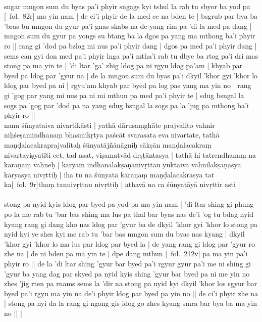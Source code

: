\documentclass[12pt]{article}
\begin{document}
\textbf{\TVB}\\
sngar mngon sum du byas pa'i phyir sngags kyi tshul la rab tu sbyor ba yod pa [\TVB\ fol.\ 82r] ma yin nam | de ci'i phyir de la med ce na bden te | bsgrub par bya ba 'bras bu mngon du gyur pa'i gnas skabs na de yang rim pa 'di la med pa dang | mngon sum du gyur pa yongs su btang ba la dgos pa yang ma mthong ba'i phyir ro || rang gi 'dod pa bzlog mi nus pa'i phyir dang | dgos pa med pa'i phyir dang | sems can gyi don med pa'i phyir lnga pa'i mtha'i rab tu dbye ba rtog pa'i dri mas stong pa ma yin te | 'di ltar 'ga' zhig ldog pa ni rgyu ldog pa'am | khyab par byed pa ldog par 'gyur na | de la mngon sum du byas pa'i dkyil 'khor gyi 'khor lo ldog par byed pa ni | rgyu'am khyab par byed pa log pas yang ma yin no | rang gi 'gog par yang mi nus pa ni mi mthun pa med pa'i phyir te | sdug bsngal la sogs pa 'gog par 'dod pa na yang sdug bsngal la sogs pa la 'jug pa mthong ba'i phyir ro || \\

nanu śūnyataiva nivartikāsti | yathā dārusaṃghāte prajvalito vahnir niḥśeṣamindhanaṃ bhasmīkṛtya paścāt svarasata eva nivartate, tathā maṇḍalacakraprajvalitaḥ śūnyatājñānāgniḥ sākṣān maṇḍalacakraṃ nivartayiṣyatīti cet, tad asat, viṣamatvād dṛṣṭāntasya | tathā hi tatrendhanaṃ na kāraṇaṃ vahneḥ | kāryam indhanalakṣaṇanivṛttau yuktaiva vahnilakṣaṇasya kāryasya nivṛttiḥ | iha tu na śūnyatā kāraṇaṃ maṇḍalacakrasya tat ka[\MS\ fol.\ 9r]thaṃ tannivṛttau nivṛttiḥ | athavā na ca śūnyatāyā nivṛttir asti |\\

\textbf{\TVA}\\
stong pa nyid kyis ldog par byed pa yod pa ma yin nam | 'di ltar shing gi phung po la me rab tu 'bar bas shing ma lus pa thal bar byas nas de'i 'og tu bdag nyid kyang rang gi dang kho nas ldog par 'gyur ba de dkyil 'khor gyi 'khor lo stong pa nyid kyi ye shes kyi me rab tu 'bar bas mngon sum du byas nas kyang | dkyil 'khor gyi 'khor lo ma lus par ldog par byed la | de yang rang gi ldog par 'gyur ro zhe na | de ni bden pa ma yin te | dpe dang mthun [\TVA\ fol.\ 212v] pa ma yin pa'i phyir ro || de la 'di ltar shing 'gyur bar byed pa'i rgyur gyur pa'i me ni shing gi 'gyur ba yang dag par skyed pa nyid kyis shing 'gyur bar byed pa ni me yin no zhes 'jig rten pa rnams sems la 'dir na stong pa nyid kyi dkyil 'khor los sgyur bar byed pa'i rgyu ma yin na de'i phyir ldog par byed pa yin no || de ci'i phyir zhe na | stong pa nyi da la rang gi ngang gis ldog go zhes kyang smra bar bya ba ma yin no ||  |\\
\end{document}
